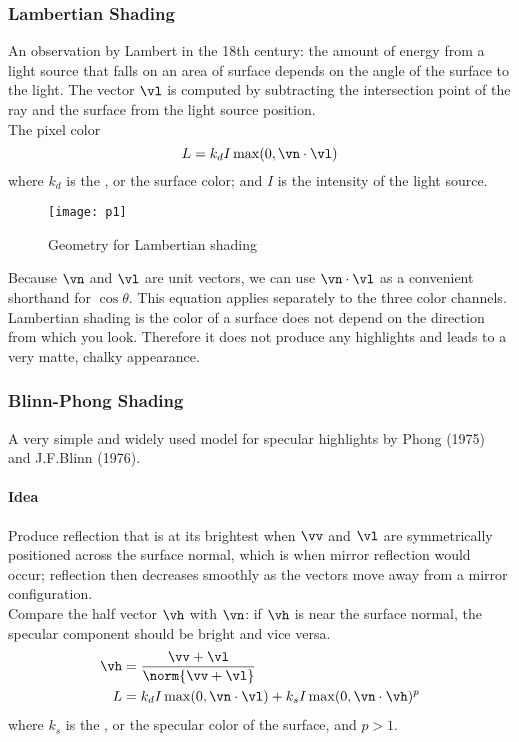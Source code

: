 \documentclass[11pt]{article}
\numberwithin{equation}{section}
\begin{document}
\subsubsection{Lambertian Shading}
An observation by Lambert in the 18th century: the amount of energy from a light source that falls on an area of surface depends on the angle of the surface to the light.
The vector $\vl$ is computed by subtracting the intersection point of the ray and the surface from the light source position.\\
The pixel color
$$L = k_dI\max(0, \vn \cdot \vl)$$
where $k_d$ is the , or the surface color; and $I$ is the intensity of the light source.
\begin{figure}[H]
	\centering
	\texttt{[image: p1]}
	\caption{Geometry for Lambertian shading}
\end{figure}
\remark
Because $\vn$ and $\vl$ are unit vectors, we can use $\vn \cdot \vl$ as a convenient shorthand for $\cos \theta$. This equation applies separately to the three color channels.
\remark
Lambertian shading is  the color of a surface does not depend on the direction from which you look. Therefore it does not produce any highlights and leads to a very matte, chalky appearance.

\subsubsection{Blinn-Phong Shading}
A very simple and widely used model for specular highlights by Phong (1975) and J.F.Blinn (1976).
\paragraph{Idea}
Produce reflection that is at its brightest when $\vv$ and $\vl$ are symmetrically positioned across the surface normal, which is when mirror reflection would occur; reflection then decreases smoothly as the vectors move away from a mirror configuration.\\
Compare the half vector $\vh$ with $\vn$: if $\vh$ is near the surface normal, the specular component should be bright and vice versa.
\begin{align*}
	\vh &= \frac{\vv + \vl}{\norm{\vv + \vl}} \\
	L &= k_d I \max(0, \vn \cdot \vl) + k_s I \max(0, \vn \cdot \vh)^p
\end{align*}
where $k_s$ is the , or the specular color of the surface, and $p > 1$.
\end{document}
